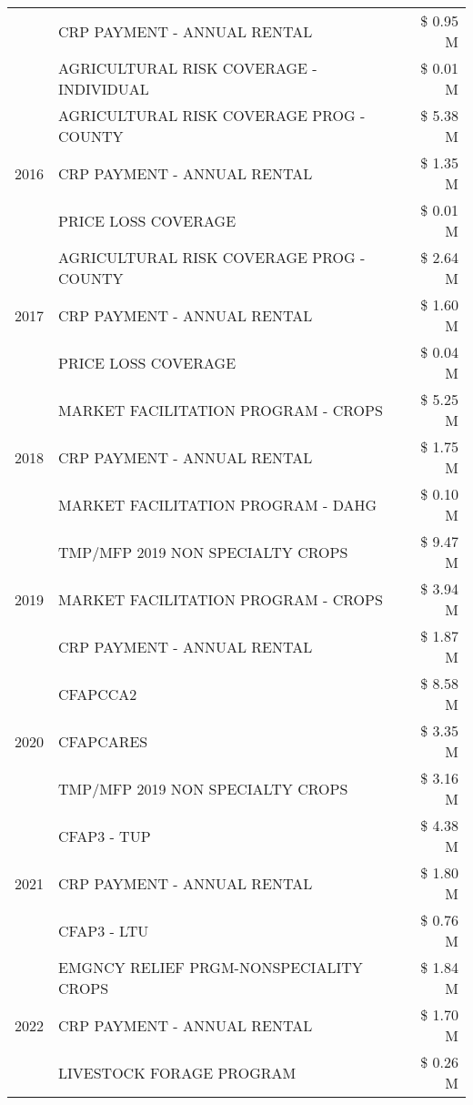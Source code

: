 \begin{tabular}{llr}
 & CRP PAYMENT - ANNUAL RENTAL & \$ 0.95 M \\
 & AGRICULTURAL RISK COVERAGE - INDIVIDUAL & \$ 0.01 M \\
\cline{1-3}
\multirow[t]{3}{*}{2016} & AGRICULTURAL RISK COVERAGE PROG - COUNTY & \$ 5.38 M \\
 & CRP PAYMENT - ANNUAL RENTAL & \$ 1.35 M \\
 & PRICE LOSS COVERAGE & \$ 0.01 M \\
\cline{1-3}
\multirow[t]{3}{*}{2017} & AGRICULTURAL RISK COVERAGE PROG - COUNTY & \$ 2.64 M \\
 & CRP PAYMENT - ANNUAL RENTAL & \$ 1.60 M \\
 & PRICE LOSS COVERAGE & \$ 0.04 M \\
\cline{1-3}
\multirow[t]{3}{*}{2018} & MARKET FACILITATION PROGRAM - CROPS & \$ 5.25 M \\
 & CRP PAYMENT - ANNUAL RENTAL & \$ 1.75 M \\
 & MARKET FACILITATION PROGRAM - DAHG & \$ 0.10 M \\
\cline{1-3}
\multirow[t]{3}{*}{2019} & TMP/MFP 2019 NON SPECIALTY CROPS & \$ 9.47 M \\
 & MARKET FACILITATION PROGRAM - CROPS & \$ 3.94 M \\
 & CRP PAYMENT - ANNUAL RENTAL & \$ 1.87 M \\
\cline{1-3}
\multirow[t]{3}{*}{2020} & CFAPCCA2 & \$ 8.58 M \\
 & CFAPCARES & \$ 3.35 M \\
 & TMP/MFP 2019 NON SPECIALTY CROPS & \$ 3.16 M \\
\cline{1-3}
\multirow[t]{3}{*}{2021} & CFAP3 - TUP & \$ 4.38 M \\
 & CRP PAYMENT - ANNUAL RENTAL & \$ 1.80 M \\
 & CFAP3 - LTU & \$ 0.76 M \\
\cline{1-3}
\multirow[t]{3}{*}{2022} & EMGNCY RELIEF PRGM-NONSPECIALITY CROPS & \$ 1.84 M \\
 & CRP PAYMENT - ANNUAL RENTAL & \$ 1.70 M \\
 & LIVESTOCK FORAGE PROGRAM & \$ 0.26 M \\
\cline{1-3}
\bottomrule
\end{tabular}
